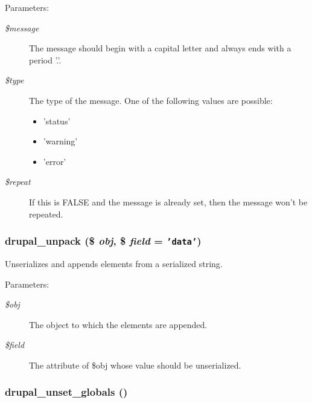 \begin{Desc}
\item[Parameters:]
\begin{description}
\item[{\em \$message}]The message should begin with a capital letter and always ends with a period '.'. \item[{\em \$type}]The type of the message. One of the following values are possible:\begin{itemize}
\item 'status'\item 'warning'\item 'error' \end{itemize}
\item[{\em \$repeat}]If this is FALSE and the message is already set, then the message won't be repeated. \end{description}
\end{Desc}
\hypertarget{bootstrap_8inc_4ca39fd7bed1a45e340f86bc2d59224d}{
\subsubsection[{drupal\_\-unpack}]{\setlength{\rightskip}{0pt plus 5cm}drupal\_\-unpack (\$ {\em obj}, \/  \$ {\em field} = {\tt 'data'})}}
\label{bootstrap_8inc_4ca39fd7bed1a45e340f86bc2d59224d}


Unserializes and appends elements from a serialized string.

\begin{Desc}
\item[Parameters:]
\begin{description}
\item[{\em \$obj}]The object to which the elements are appended. \item[{\em \$field}]The attribute of \$obj whose value should be unserialized. \end{description}
\end{Desc}
\hypertarget{bootstrap_8inc_f4eb5dc356848a28e53aed5ee6eff6a8}{
\subsubsection[{drupal\_\-unset\_\-globals}]{\setlength{\rightskip}{0pt plus 5cm}drupal\_\-unset\_\-globals ()}}
\label{bootstrap_8inc_f4eb5dc356848a28e53aed5ee6eff6a8}


